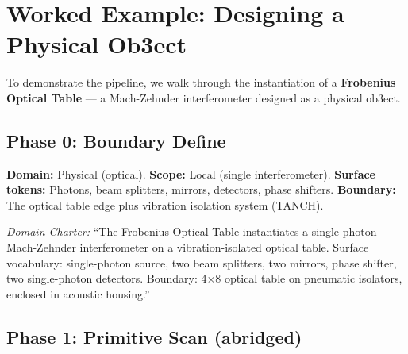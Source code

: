 \documentclass[12pt,a4paper]{article}
\begin{document}
\section{Worked Example: Designing a Physical Ob3ect}

To demonstrate the pipeline, we walk through the instantiation of a \textbf{Frobenius
Optical Table} — a Mach-Zehnder interferometer designed as a physical ob3ect.

\subsection*{Phase 0: Boundary Define}

\textbf{Domain:} Physical (optical). \textbf{Scope:} Local (single interferometer).
\textbf{Surface tokens:} Photons, beam splitters, mirrors, detectors, phase shifters.
\textbf{Boundary:} The optical table edge plus vibration isolation system (TANCH).

{\it Domain Charter:} ``The Frobenius Optical Table instantiates a single-photon
Mach-Zehnder interferometer on a vibration-isolated optical table. Surface vocabulary:
single-photon source, two beam splitters, two mirrors, phase shifter, two single-photon
detectors. Boundary: 4$\times$8 optical table on pneumatic isolators, enclosed in
acoustic housing.''

\subsection*{Phase 1: Primitive Scan (abridged)}
\end{document}
